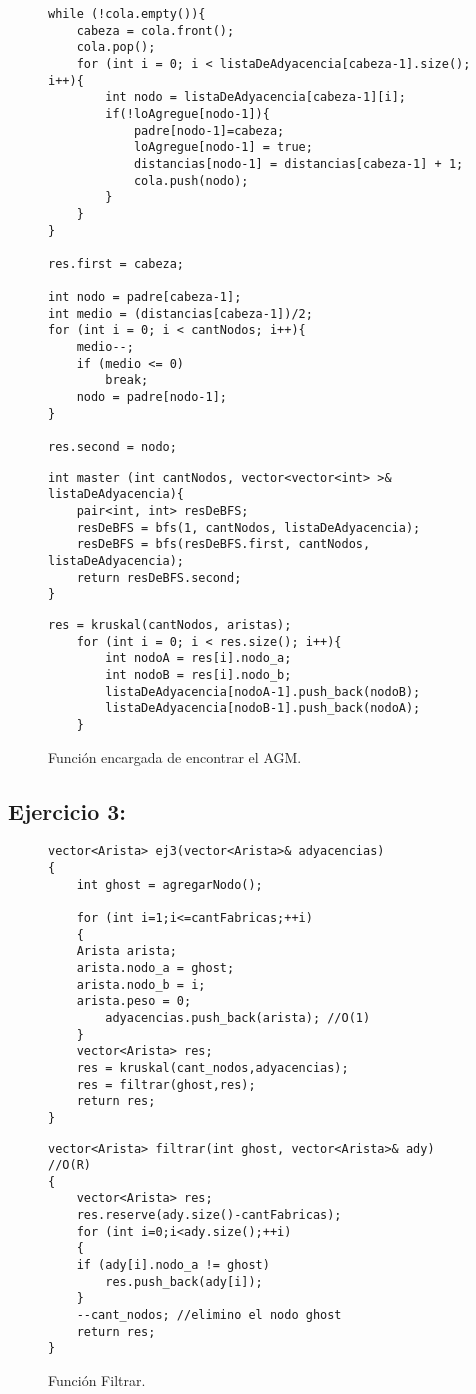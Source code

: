 \documentclass[10pt, a4paper]{article}
\begin{document}
\begin{figure}[H]
\begin{center}
\begin{verbatim}
while (!cola.empty()){
	cabeza = cola.front();
	cola.pop();			
	for (int i = 0; i < listaDeAdyacencia[cabeza-1].size(); i++){
		int nodo = listaDeAdyacencia[cabeza-1][i];	
		if(!loAgregue[nodo-1]){ 
			padre[nodo-1]=cabeza;
			loAgregue[nodo-1] = true;
			distancias[nodo-1] = distancias[cabeza-1] + 1;
			cola.push(nodo);
		}		
	}	
}
	
res.first = cabeza;
	
int nodo = padre[cabeza-1];
int medio = (distancias[cabeza-1])/2;
for (int i = 0; i < cantNodos; i++){
	medio--;
	if (medio <= 0)
		break;
	nodo = padre[nodo-1];
}
	
res.second = nodo;
\end{verbatim}
\caption{BFS.}

\begin{verbatim}
int master (int cantNodos, vector<vector<int> >& listaDeAdyacencia){
	pair<int, int> resDeBFS;
	resDeBFS = bfs(1, cantNodos, listaDeAdyacencia);
	resDeBFS = bfs(resDeBFS.first, cantNodos, listaDeAdyacencia);
	return resDeBFS.second;
}
\end{verbatim}
\caption{Función encargada de buscar el master.}

\begin{verbatim}
res = kruskal(cantNodos, aristas);	
	for (int i = 0; i < res.size(); i++){
		int nodoA = res[i].nodo_a;
		int nodoB = res[i].nodo_b;
		listaDeAdyacencia[nodoA-1].push_back(nodoB);
		listaDeAdyacencia[nodoB-1].push_back(nodoA);
	}
\end{verbatim}
\caption{Función encargada de encontrar el AGM.}
\end{center}
\end{figure}
\subsection{Ejercicio 3:}

\begin{figure}[H]
\begin{center}
\begin{verbatim}
vector<Arista> ej3(vector<Arista>& adyacencias)
{
    int ghost = agregarNodo();

    for (int i=1;i<=cantFabricas;++i) 
    {
	Arista arista;
	arista.nodo_a = ghost;
	arista.nodo_b = i;
	arista.peso = 0;
        adyacencias.push_back(arista); //O(1)
    }
    vector<Arista> res;
    res = kruskal(cant_nodos,adyacencias);
    res = filtrar(ghost,res); 
    return res;
}
\end{verbatim}
\caption{Selección de Rutas.}

\begin{verbatim}
vector<Arista> filtrar(int ghost, vector<Arista>& ady) //O(R)
{
    vector<Arista> res;
    res.reserve(ady.size()-cantFabricas);
    for (int i=0;i<ady.size();++i)
    {
	if (ady[i].nodo_a != ghost)
		res.push_back(ady[i]);
    }
    --cant_nodos; //elimino el nodo ghost
    return res;
}
\end{verbatim}
\caption{Función Filtrar.}
\end{center}
\end{figure}
\end{document}
